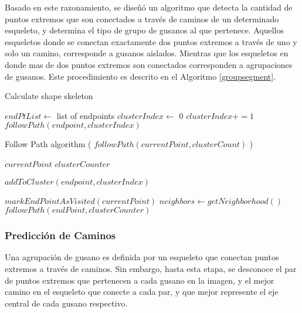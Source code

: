 Basado en este razonamiento, se dise\~n\'o un algoritmo que detecta la cantidad de
puntos extremos que son conectados a trav\'es de caminos de un determinado esqueleto,
y determina el tipo de grupo de gusanos al que pertenece. Aquellos esqueletos donde
se conectan exactamente dos puntos extremos a trav\'es de uno y solo un camino, corresponde
a gusanos aislados. Mientras que los esqueletos en donde mas de dos puntos extremos son
conectados corresponden a agrupaciones de gusanos.
Este procedimiento es descrito en el Algoritmo \ref{groupsegment}. 

\begin{algorithm}[h]                     
\caption{Calculate shape skeleton}         
\label{groupsegment}                    
\begin{algorithmic}                   

\STATE $endPtList \leftarrow$ list of endpoints
\STATE $clusterIndex \leftarrow$ 0
\STATE {}
\ELSE
\STATE $clusterIndex +=1$
\STATE $followPath(endpoint,clusterIndex)$
\ENDIF
\ENDFOR
\end{algorithmic}
\end{algorithm}

\begin{algorithm}[h]                     
\caption{Follow Path algorithm ( $followPath(currentPoint,clusterCount)$ )}         
\begin{algorithmic}                   

\REQUIRE $currentPoint$
\REQUIRE $clusterCounter$

\RETURN 
\ELSE
\STATE $addToCluster(endpoint,clusterIndex)$
\ENDIF

\STATE {}
\STATE $markEndPointAsVisited(currentPoint)$
\ENDIF
\STATE $neighbors \leftarrow getNeighborhood()$
\STATE $followPath(endPoint,clusterCounter)$
\ENDFOR

\end{algorithmic}
\end{algorithm}


\subsubsection*{Predicci\'on de Caminos}
\label{sec:pathguessing}

Una agrupaci\'on de gusano es definida por un esqueleto
que conectan puntos extremos a trav\'es de caminos. Sin embargo, hasta esta etapa,
se desconoce el par de puntos extremos que pertenecen a cada gusano en la imagen, y 
el mejor camino en el esqueleto
que conecte a cada par, y que mejor represente el eje central de cada gusano 
respectivo.\\

